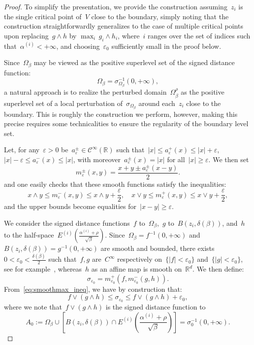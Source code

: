 \documentclass[10pt]{article}
\newcommand{\R}{\mathbb{R}}
\newcommand{\1}{\mathbbm 1}
\newcommand{\largeRadius}{\delta}
\newcommand{\epsLimit}[1]{\alpha^{(#1)}} %
\newcommand{\halfSpace}[1]{E^{(#1)}}
\newcommand{\shift}{\rho} %
\begin{document}
    \begin{proof}
        To simplify the presentation, we provide the construction assuming~$z_i$ is the single critical point of~$V$ close to the boundary, simply noting that the construction straightforwardly generalizes to the case of multiple critical points upon replacing~$g\land h$ by
        $\max_i\, g_i \land h_i$, where~$i$ ranges over the set of indices such that~$\epsLimit{i}<+\infty$, and choosing~$\varepsilon_0$ sufficiently small in the proof below.

        Since~$\Omega_\beta$ may be viewed as the positive superlevel set of the signed distance function:
        \[\Omega_\beta = \sigma_{\Omega_\beta}^{-1}(0,+\infty),\]
        a natural approach is to realize the perturbed domain~$\Omega_\beta^\shift$ as the positive superlevel set of a local perturbation of~$\sigma_{\Omega_\beta}$ around each~$z_i$ close to the boundary.
        This is roughly the construction we perform, however, making this precise requires some technicalities to ensure the regularity of the boundary level set.
        
        Let, for any~$\varepsilon>0$ be~$a_\varepsilon^\pm\in \mathcal C^\infty(\R)$ such that~$|x| \leq a^+_\varepsilon(x)\leq |x| + \varepsilon$,~$|x|-\varepsilon\leq a^-_\varepsilon(x)\leq |x|$, with moreover~$a^\pm_\varepsilon(x) = |x|$ for all~$|x|\geq\varepsilon$.
        We then set
        \[m^{\pm}_\varepsilon(x,y) = \frac{x+y\pm a^\pm_\varepsilon(x-y)}2.\]
        and one easily checks that these smooth functions satisfy the inequalities:
        \begin{equation}
            \label{eq:smoothmax_ineq}
            x\land y \leq m^{-}_\varepsilon(x,y) \leq x\land y + \frac\varepsilon2,\quad x\lor y \leq m^{+}_\varepsilon(x,y) \leq x\lor y + \frac\varepsilon2,
        \end{equation}
        and the upper bounds become equalities for~$|x-y| \geq \varepsilon$.

        We consider the signed distance functions~$f$ to~$\Omega_\beta$,~$g$ to~$B(z_i,\largeRadius(\beta))$, and~$h$ to the half-space~$\halfSpace{i}\left(\frac{\epsLimit{i}+\shift}{\sqrt\beta}\right)$.
        Since~$\Omega_\beta = f^{-1}(0,+\infty)$ and $B(z_i,\largeRadius(\beta))=g^{-1}(0,+\infty)$ are smooth and bounded, there exists~$0<\varepsilon_0 < \frac{\largeRadius(\beta)}2$ such that~$f,g$ are~$C^\infty$ respectively on~$\{|f|<\varepsilon_0\}$ and~$\{|g|<\varepsilon_0\}$, see for example~\cite[Lemma 14.16]{GT01}, whereas~$h$ as an affine map is smooth on~$\R^d$.
        We then define:
        $$\sigma_{\varepsilon_0} = m_{\varepsilon_0}^{+}(f,m_{\varepsilon_0}^{-}(g,h)).$$
        From~\eqref{eq:smoothmax_ineq}, we have by construction that:
        \begin{equation}
            \label{eq:sdf_ineq}
           f\lor (g\land h) \leq \sigma_{\varepsilon_0} \leq f\lor (g\land h) + \varepsilon_0,
        \end{equation}
        where we note that~$f\lor(g\land h)$ is the signed distance function to
        \[A_0 := \Omega_\beta \cup \left[ B(z_i,\largeRadius(\beta))\cap \halfSpace{i}\left(\frac{\epsLimit{i}+\shift}{\sqrt\beta}\right)\right] = \sigma_0^{-1}(0,+\infty).\]


\end{proof}
\end{document}
